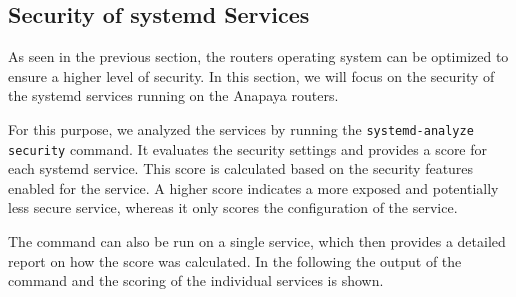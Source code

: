 \subsection{Security of systemd Services}
\label{sec:systemd-services}
As seen in the previous section, the routers operating system can be optimized to ensure a higher level of security.
In this section, we will focus on the security of the systemd services running on the Anapaya routers.

For this purpose, we analyzed the services by running the \texttt{systemd-analyze security} command.
It evaluates the security settings and provides a score for each systemd service.
This score is calculated based on the security features enabled for the service.
A higher score indicates a more exposed and potentially less secure service, whereas it only scores the configuration of the service.

The command can also be run on a single service, which then provides a detailed report on how the score was calculated.
In the following the output of the command and the scoring of the individual services is shown.


